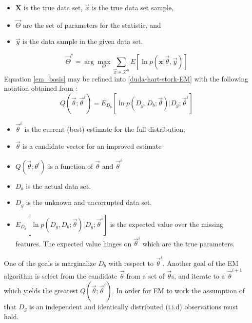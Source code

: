 \documentclass[11pt]{article}
\begin{document}
\begin{itemize}
\item  $\mathbf{X}$ is the true data set, $\vec{x}$ is the true data set sample, 
 \item $\vec{\Theta}$ are the set of parameters for the statistic, and 
 \item $\vec{y}$ is the data sample in the given data set.
 \end{itemize}
\begin{equation}
\vec{\Theta}^* = \arg \max_{\Theta} \sum_{\vec{x}\in \mathcal{X}^n} E[ \ln p( \mathbf{x} | \vec{\theta} ,\vec{y}) ] \label{em_basis}
\end{equation}
Equation \ref{em_basis} may be refined into \ref{duda-hart-stork-EM} with the following notation obtained from \cite{duda-hart-stork}:
\begin{equation}
Q( \vec{\theta} ; \vec{\theta}^i) = E_{D_b} [ \ln p(D_g, D_b; \vec{\theta}) | D_g ; \vec{\theta}^i ] \label{duda-hart-stork-EM}
\end{equation}
\begin{itemize}
	\item $\vec{\theta}^i$ is the current (best) estimate for the full distribution;  
	\item $\vec{\theta}$ is a candidate vector for an improved estimate 
	\item $Q(\vec{\theta} ; \theta^i)$ is a function of $\vec{\theta}$ and $\vec{\theta}^i$
	\item $D_b$ is the actual data set.  
	\item $D_g$ is the unknown and uncorrupted data set.
	\item $E_{D_b} [ \ln p(D_g, D_b; \vec{\theta}) | D_g ; \vec{\theta}^i ] $ is the expected value over the missing features.  The expected value hinges on $\vec{\theta}^i$ which are the true parameters.
\end{itemize}
One of the goals is marginalize $D_b$ with respect to $\vec{\theta}^i$.  Another goal of the EM algorithm is select from the candidate $\vec{\theta}$ from a set of $\vec{\theta}$s, and iterate to a $\vec{\theta}^{i+1}$ which yields the greatest $Q(\vec{\theta} ; \vec{\theta}^i)$.  In order for EM to work the assumption of that $D_g$ is an independent and identically distributed (i.i.d) observations must hold. 
\end{document}
